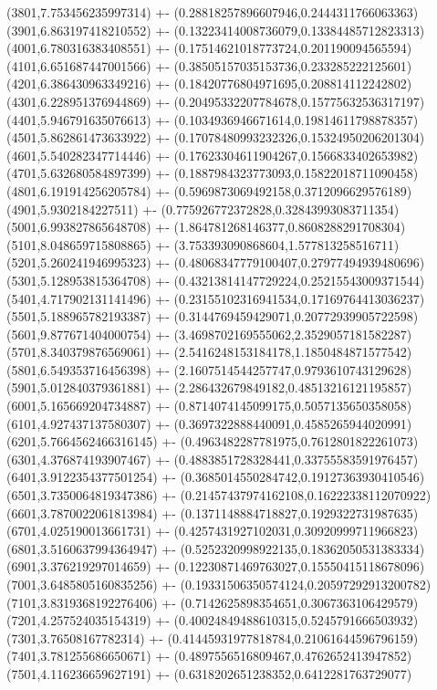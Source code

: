 {(3801,7.753456235997314) +- (0.28818257896607946,0.2444311766063363)
(3901,6.863197418210552) +- (0.13223414008736079,0.13384485712823313)
(4001,6.780316383408551) +- (0.17514621018773724,0.201190094565594)
(4101,6.651687447001566) +- (0.38505157035153736,0.233285222125601)
(4201,6.386430963349216) +- (0.18420776804971695,0.208814112242802)
(4301,6.228951376944869) +- (0.20495332207784678,0.15775632536317197)
(4401,5.946791635076613) +- (0.1034936946671614,0.19814611798878357)
(4501,5.862861473633922) +- (0.17078480993232326,0.15324950206201304)
(4601,5.540282347714446) +- (0.17623304611904267,0.1566833402653982)
(4701,5.632680584897399) +- (0.1887984323773093,0.15822018711090458)
(4801,6.191914256205784) +- (0.5969873069492158,0.3712096629576189)
(4901,5.9302184227511) +- (0.775926772372828,0.32843993083711354)
(5001,6.993827865648708) +- (1.864781268146377,0.8608288291708304)
(5101,8.048659715808865) +- (3.753393090868604,1.577813258516711)
(5201,5.260241946995323) +- (0.48068347779100407,0.27977494939480696)
(5301,5.128953815364708) +- (0.43213814147729224,0.25215543009371544)
(5401,4.717902131141496) +- (0.23155102316941534,0.17169764413036237)
(5501,5.188965782193387) +- (0.3144769459429071,0.20772939905722598)
(5601,9.877671404000754) +- (3.4698702169555062,2.3529057181582287)
(5701,8.340379876569061) +- (2.5416248153184178,1.1850484871577542)
(5801,6.549353716456398) +- (2.1607514544257747,0.9793610743129628)
(5901,5.012840379361881) +- (2.286432679849182,0.48513216121195857)
(6001,5.165669204734887) +- (0.8714074145099175,0.5057135650358058)
(6101,4.927437137580307) +- (0.3697322888440091,0.4585265944020991)
(6201,5.7664562466316145) +- (0.4963482287781975,0.7612801822261073)
(6301,4.376874193907467) +- (0.4883851728328441,0.33755583591976457)
(6401,3.9122354377501254) +- (0.3685014550284742,0.19127363930410546)
(6501,3.7350064819347386) +- (0.21457437974162108,0.16222338112070922)
(6601,3.7870022061813984) +- (0.1371148884718827,0.1929322731987635)
(6701,4.025190013661731) +- (0.4257431927102031,0.30920999711966823)
(6801,3.5160637994364947) +- (0.5252320998922135,0.18362050531383334)
(6901,3.376219297014659) +- (0.12230871469763027,0.15550415118678096)
(7001,3.6485805160835256) +- (0.19331506350574124,0.20597292913200782)
(7101,3.8319368192276406) +- (0.7142625898354651,0.3067363106429579)
(7201,4.257524035154319) +- (0.40024849488610315,0.5245791666503932)
(7301,3.76508167782314) +- (0.41445931977818784,0.21061644596796159)
(7401,3.781255686650671) +- (0.4897556516809467,0.4762652413947852)
(7501,4.116236659627191) +- (0.6318202651238352,0.6412281763729077)
}
